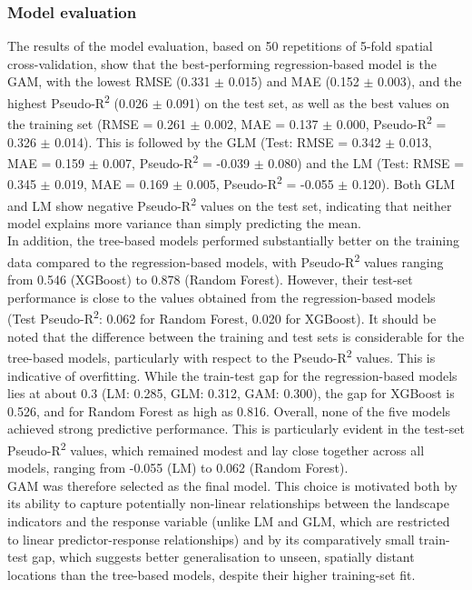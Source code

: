 \documentclass[hidelinks, 11pt]{article}
\begin{document}
\subsubsection{Model evaluation}
The results of the model evaluation, based on 50 repetitions of 5-fold spatial cross-validation, show that the best-performing regression-based model is the GAM, with the lowest RMSE (0.331 $\pm$ 0.015) and MAE (0.152 $\pm$ 0.003), and the highest Pseudo-R\textsuperscript{2} (0.026 $\pm$ 0.091) on the test set, as well as the best values on the training set (RMSE = 0.261 $\pm$ 0.002, MAE = 0.137 $\pm$ 0.000, Pseudo-R\textsuperscript{2} = 0.326 $\pm$ 0.014). This is followed by the GLM (Test: RMSE = 0.342 $\pm$ 0.013, MAE = 0.159 $\pm$ 0.007, Pseudo-R\textsuperscript{2} = -0.039 $\pm$ 0.080) and the LM (Test: RMSE = 0.345 $\pm$ 0.019, MAE = 0.169 $\pm$ 0.005, Pseudo-R\textsuperscript{2} = -0.055 $\pm$ 0.120). Both GLM and LM show negative Pseudo-R\textsuperscript{2} values on the test set, indicating that neither model explains more variance than simply predicting the mean.
\\
In addition, the tree-based models performed substantially better on the training data compared to the regression-based models, with Pseudo-R\textsuperscript{2} values ranging from 0.546 (XGBoost) to 0.878 (Random Forest). However, their test-set performance is close to the values obtained from the regression-based models (Test Pseudo-R\textsuperscript{2}: 0.062 for Random Forest, 0.020 for XGBoost). It should be noted that the difference between the training and test sets is considerable for the tree-based models, particularly with respect to the Pseudo-R\textsuperscript{2} values. This is indicative of overfitting. While the train-test gap for the regression-based models lies at about 0.3 (LM: 0.285, GLM: 0.312, GAM: 0.300), the gap for XGBoost is 0.526, and for Random Forest as high as 0.816. Overall, none of the five models achieved strong predictive performance. This is particularly evident in the test-set Pseudo-R\textsuperscript{2} values, which remained modest and lay close together across all models, ranging from -0.055 (LM) to 0.062 (Random Forest).
\\
GAM was therefore selected as the final model. This choice is motivated both by its ability to capture potentially non-linear relationships between the landscape indicators and the response variable (unlike LM and GLM, which are restricted to linear predictor-response relationships) and by its comparatively small train-test gap, which suggests better generalisation to unseen, spatially distant locations than the tree-based models, despite their higher training-set fit. 
\end{document}
